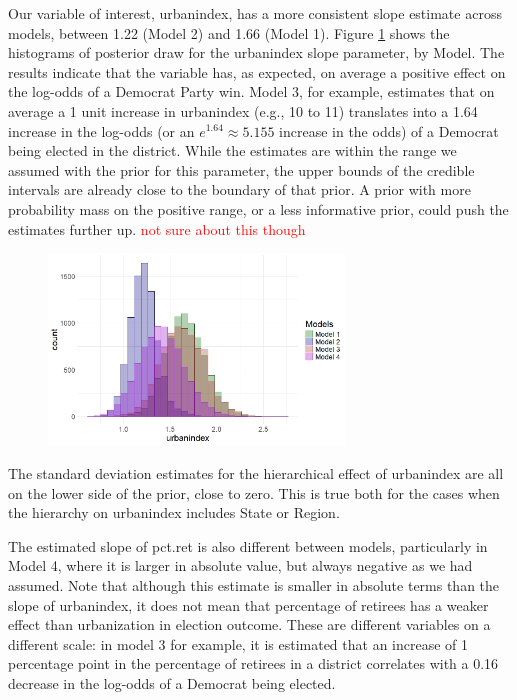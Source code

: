 \documentclass[12pt]{article}
\newcommand{\red}[1]{\textcolor{red}{#1}}
\begin{document}
Our variable of interest, urbanindex, has a more consistent slope estimate across models, between 1.22 (Model 2) and 1.66 (Model 1).
Figure \ref{fig:urbanindex_estimates} shows the histograms of posterior draw for the urbanindex slope parameter, by Model.
The results indicate that the variable has, as expected, on average a positive effect on the log-odds of a Democrat Party win.
Model 3, for example, estimates that on average a 1 unit increase in urbanindex (e.g., 10 to 11) translates into a 1.64 increase in the log-odds (or an $e^{1.64} \approx 5.155 $ increase in the odds) of a Democrat being elected in the district.
While the estimates are within the range we assumed with the prior for this parameter, the upper bounds of the credible intervals are already close to the boundary of that prior. 
A prior with more probability mass on the positive range, or a less informative prior, could push the estimates further up. \red{not sure about this though}

\begin{figure}
	\centering
	\includegraphics[width=0.7\textwidth]{results/urb_post_all_models.jpeg}
	\caption{}
	\label{fig:urbanindex_estimates}
\end{figure}

The standard deviation estimates for the hierarchical effect of urbanindex  are all on the lower side of the prior, close to zero. This is true both for the cases when the hierarchy on urbanindex includes State or Region.


The estimated slope of pct.ret is also different between models, particularly in Model 4, where it is larger in absolute value, but always negative as we had assumed. Note that although this estimate is smaller in absolute terms than the slope of urbanindex, it does not mean that percentage of retirees has a weaker effect than urbanization in election outcome. These are different variables on a different scale: in model 3 for example, it is estimated that an increase of 1 percentage point in the percentage of retirees in a district correlates with a 0.16 decrease in the log-odds of a Democrat being elected.
\end{document}
